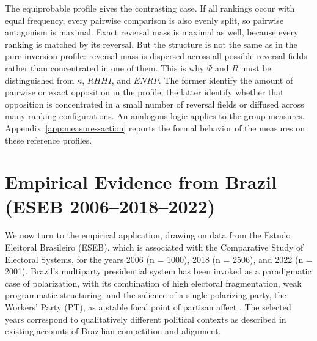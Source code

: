 \documentclass[12pt]{article}
\begin{document}
The equiprobable profile gives the contrasting case. If all rankings occur with
equal frequency, every pairwise comparison is also evenly split, so pairwise
antagonism is maximal. Exact reversal mass is maximal as well, because every
ranking is matched by its reversal. But the structure is not the same as in the
pure inversion profile: reversal mass is dispersed across all possible reversal
fields rather than concentrated in one of them. This is why \(\Psi\) and \(R\)
must be distinguished from \(\kappa\), \(RHHI\), and \(ENRP\). The former
identify the amount of pairwise or exact opposition in the profile; the latter
identify whether that opposition is concentrated in a small number of reversal
fields or diffused across many ranking configurations. An analogous logic
applies to the group measures. Appendix~\ref{app:measures-action} reports the
formal behavior of the measures on these reference profiles.






\section{Empirical Evidence from Brazil (ESEB 2006–2018–2022)}



We now turn to the empirical application, drawing on data from the Estudo
Eleitoral Brasileiro (ESEB), which is associated with the Comparative Study of
Electoral Systems, for the years 2006 (n = 1000), 2018 (n = 2506), and 2022 (n =
2001). Brazil’s multiparty presidential system has been invoked as a
paradigmatic case of polarization, with its combination of high electoral
fragmentation, weak programmatic structuring, and the salience of a single
polarizing party, the Workers’ Party (PT), as a stable focal point of partisan
affect \parencite{samuels2018partisans, nunes2023biografia}. The selected years correspond to qualitatively different
political contexts as described in existing accounts of Brazilian competition
and alignment.
\end{document}
